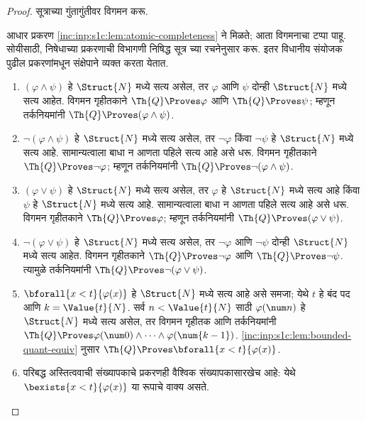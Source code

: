 \begin{proof}
सूत्राच्या गुंतागुंतीवर विगमन करू.

आधार प्रकरण \ref{inc:inp:s1c:lem:atomic-completeness} ने
मिळते; आता विगमनाचा टप्पा पाहू. सोयीसाठी,
निषेधाच्या प्रकरणाची विभागणी निषिद्ध सूत्र
च्या रचनेनुसार करू. इतर विधानीय संयोजक पुढील
प्रकरणांमधून संक्षेपाने व्यक्त करता येतात.

\begin{enumerate}
\item $(\varphi \land \psi)$ हे $\Struct{N}$ मध्ये सत्य
असेल, तर $\varphi$ आणि $\psi$ दोन्ही $\Struct{N}$ मध्ये सत्य आहेत.
विगमन गृहीतकाने
$\Th{Q} \Proves \varphi$ आणि
$\Th{Q} \Proves \psi$; म्हणून तर्कनियमांनी
$\Th{Q} \Proves (\varphi \land \psi)$.

\item $\lnot (\varphi \land \psi)$ हे $\Struct{N}$
मध्ये सत्य असेल, तर $\lnot \varphi$ किंवा
$\lnot \psi$ हे $\Struct{N}$ मध्ये सत्य आहे. सामान्यत्वाला बाधा
न आणता पहिले सत्य आहे असे धरू.
विगमन गृहीतकाने $\Th{Q} \Proves \lnot \varphi$;
म्हणून तर्कनियमांनी
$\Th{Q} \Proves \lnot (\varphi \land \psi)$.

\item $(\varphi \lor \psi)$ हे $\Struct{N}$ मध्ये सत्य
असेल, तर $\varphi$ हे $\Struct{N}$ मध्ये सत्य आहे किंवा
$\psi$ हे $\Struct{N}$ मध्ये सत्य आहे.
सामान्यत्वाला बाधा न आणता पहिले सत्य आहे
असे धरू. विगमन गृहीतकाने
$\Th{Q} \Proves \varphi$;
म्हणून तर्कनियमांनी
$\Th{Q} \Proves (\varphi \lor \psi)$.

\item $\lnot(\varphi \lor \psi)$ हे $\Struct{N}$
मध्ये सत्य असेल, तर $\lnot \varphi$ आणि
$\lnot \psi$ दोन्ही $\Struct{N}$ मध्ये सत्य आहेत.
विगमन गृहीतकाने
$\Th{Q} \Proves \lnot \varphi$ आणि
$\Th{Q} \Proves \lnot \psi$.
त्यामुळे तर्कनियमांनी
$\Th{Q} \Proves \lnot(\varphi \lor \psi)$.

\item $\bforall{x<t}{\varphi(x)}$ हे
$\Struct{N}$ मध्ये सत्य आहे असे समजा;
येथे $t$ हे बंद पद आणि $k=\Value{t}{N}$.
सर्व $n < \Value{t}{N}$ साठी
$\varphi(\num n)$ हे $\Struct{N}$ मध्ये सत्य
असेल, तर विगमन गृहीतक आणि तर्कनियमांनी
$\Th{Q} \Proves
\varphi(\num 0) \land \dots \land \varphi(\num{k-1})$.
\ref{inc:inp:s1c:lem:bounded-quant-equiv} नुसार
$\Th{Q} \Proves \bforall{x<t}{\varphi(x)}$.

\item परिबद्ध अस्तित्ववाची संख्यापकाचे
प्रकरणही वैश्विक संख्यापकासारखेच आहे:
येथे $\bexists{x < t}{\varphi(x)}$ या रूपाचे
वाक्य असते.


\end{enumerate}
\end{proof}
